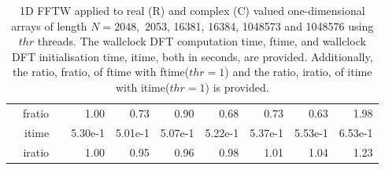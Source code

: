 \documentclass[a4paper]{article}
\begin{document}
\begin{table}[!htbp]
\begin{center}
\begin{small}
\begin{tabular}{|r|r|r|r|r|r|r|r|r|r|}
      & fratio & & 1.00 &   0.73 &  0.90 &  0.68 &  0.73 &  0.63 &  1.98  \\
     & itime & &  5.30e-1 &   5.01e-1 &   5.07e-1 &   5.22e-1 &   5.37e-1 &   5.53e-1 &   6.53e-1   \\ 
 & iratio & &  1.00 &   0.95 &  0.96 &  0.98 &  1.01 &   1.04 &   1.23  \\  \hline 
\end{tabular}
\caption{1D FFTW applied to real (R) and complex (C) valued one-dimensional arrays of length $N=2048,$ 2053, 16381, 16384, 1048573 and 1048576 using $thr$ threads. The wallclock DFT computation time, ftime, and wallclock DFT initialisation time, itime, both in seconds, are provided. Additionally,  the ratio, fratio, of ftime  with ftime($thr=1$) and the ratio, iratio, of itime  with itime($thr=1$) is provided. }\label{Tbl:FFTW1d}
\end{small}
\end{center}
\end{table}
\end{document}
